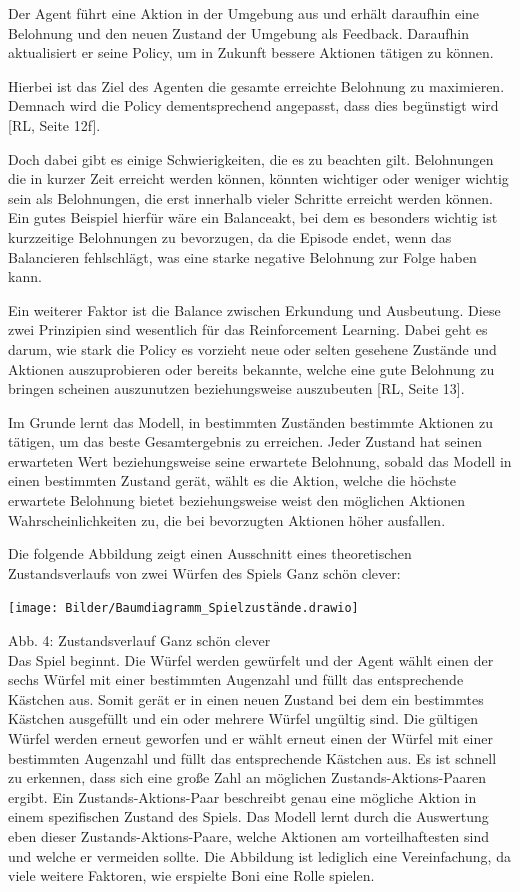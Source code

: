 Der Agent führt eine Aktion in der Umgebung aus und erhält daraufhin eine Belohnung und den neuen Zustand der Umgebung als Feedback. Daraufhin aktualisiert er seine Policy, um in Zukunft bessere Aktionen tätigen zu können.

Hierbei ist das Ziel des Agenten die gesamte erreichte Belohnung zu maximieren. Demnach wird die Policy dementsprechend angepasst, dass dies begünstigt wird [RL, Seite 12f].

Doch dabei gibt es einige Schwierigkeiten, die es zu beachten gilt. Belohnungen die in kurzer Zeit erreicht werden können, könnten wichtiger oder weniger wichtig sein als Belohnungen, die erst innerhalb vieler Schritte erreicht werden können. Ein gutes Beispiel hierfür wäre ein Balanceakt, bei dem es besonders wichtig ist kurzzeitige Belohnungen zu bevorzugen, da die Episode endet, wenn das Balancieren fehlschlägt, was eine starke negative Belohnung zur Folge haben kann.

Ein weiterer Faktor ist die Balance zwischen Erkundung und Ausbeutung. Diese zwei Prinzipien sind wesentlich für das Reinforcement Learning. Dabei geht es darum, wie stark die Policy es vorzieht neue oder selten gesehene Zustände und Aktionen auszuprobieren oder bereits bekannte, welche eine gute Belohnung zu bringen scheinen auszunutzen beziehungsweise auszubeuten [RL, Seite 13].

Im Grunde lernt das Modell, in bestimmten Zuständen bestimmte Aktionen zu tätigen, um das beste Gesamtergebnis zu erreichen. Jeder Zustand hat seinen erwarteten Wert beziehungsweise seine erwartete Belohnung, sobald das Modell in einen bestimmten Zustand gerät, wählt es die Aktion, welche die höchste erwartete Belohnung bietet beziehungsweise weist den möglichen Aktionen Wahrscheinlichkeiten zu, die bei bevorzugten Aktionen höher ausfallen.

\begin{minipage}{\linewidth}
Die folgende Abbildung zeigt einen Ausschnitt eines theoretischen Zustandsverlaufs von zwei Würfen des Spiels Ganz schön clever:
	
	\vspace{0.5cm}
	\texttt{[image: Bilder/Baumdiagramm\_Spielzustände.drawio]} 
	
	Abb. 4: Zustandsverlauf Ganz schön clever\\
	
Das Spiel beginnt. Die Würfel werden gewürfelt und der Agent wählt einen der sechs Würfel mit einer bestimmten Augenzahl und füllt das entsprechende Kästchen aus. Somit gerät er in einen neuen Zustand bei dem ein bestimmtes Kästchen ausgefüllt und ein oder mehrere Würfel ungültig sind. Die gültigen Würfel werden erneut geworfen und er wählt erneut einen der Würfel mit einer bestimmten Augenzahl und füllt das entsprechende Kästchen aus. Es ist schnell zu erkennen, dass sich eine große Zahl an möglichen Zustands-Aktions-Paaren ergibt. Ein Zustands-Aktions-Paar beschreibt genau eine mögliche Aktion in einem spezifischen Zustand des Spiels. Das Modell lernt durch die Auswertung eben dieser Zustands-Aktions-Paare, welche Aktionen am vorteilhaftesten sind und welche er vermeiden sollte. Die Abbildung ist lediglich eine Vereinfachung, da viele weitere Faktoren, wie erspielte Boni eine Rolle spielen.
\end{minipage}
